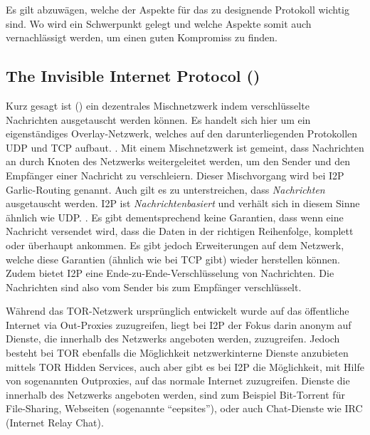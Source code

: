 Es gilt abzuwägen, welche der Aspekte für das zu designende Protokoll wichtig sind.
Wo wird ein Schwerpunkt gelegt und welche Aspekte somit auch vernachlässigt werden, um einen guten Kompromiss zu finden. \parencite{das_anonymity_2018}

\subsection{The Invisible Internet Protocol () }

Kurz gesagt ist  () ein dezentrales Mischnetzwerk indem verschlüsselte Nachrichten ausgetauscht werden können.
\parencite{zantout_i2p_2011}
Es handelt sich hier um ein eigenständiges Overlay-Netzwerk, welches auf den darunterliegenden Protokollen UDP und TCP aufbaut.  \parencite{de_boer_invisible_2019,astolfi_i2p_2015}.
Mit einem Mischnetzwerk ist gemeint, dass Nachrichten an durch Knoten des Netzwerks weitergeleitet werden, um den Sender und den Empfänger einer Nachricht zu verschleiern. Dieser Mischvorgang wird bei I2P Garlic-Routing genannt.
Auch gilt es zu unterstreichen, dass \textit{Nachrichten} ausgetauscht werden.
I2P ist \textit{Nachrichtenbasiert} und verhält sich in diesem Sinne ähnlich wie UDP. \parencite[S.~1]{zantout_i2p_2011}.
Es gibt dementsprechend keine Garantien, dass wenn eine Nachricht versendet wird, dass die Daten in der richtigen Reihenfolge, komplett oder überhaupt ankommen.
Es gibt jedoch Erweiterungen auf dem Netzwerk, welche diese Garantien (ähnlich wie bei TCP gibt) wieder herstellen können.
Zudem bietet I2P eine Ende-zu-Ende-Verschlüsselung von Nachrichten.
Die Nachrichten sind also vom Sender bis zum Empfänger verschlüsselt.

Während das TOR-Netzwerk ursprünglich entwickelt wurde auf das öffentliche Internet via Out-Proxies zuzugreifen,
liegt bei I2P der Fokus darin anonym auf Dienste, die innerhalb des Netzwerks angeboten werden, zuzugreifen.
Jedoch besteht bei TOR ebenfalls die Möglichkeit netzwerkinterne Dienste anzubieten mittels TOR Hidden Services, auch aber gibt es bei I2P die Möglichkeit, mit Hilfe von sogenannten Outproxies, auf das normale Internet zuzugreifen.
Dienste die innerhalb des Netzwerks angeboten werden, sind zum Beispiel Bit-Torrent für File-Sharing, Webseiten (sogenannte ``eepsites''), oder auch Chat-Dienste wie IRC (Internet Relay Chat).
\parencite[p.~3-4]{de_boer_invisible_2019}

\cite{astolfi_i2p_2015}

\cite{timpanaro_birds_2012}

